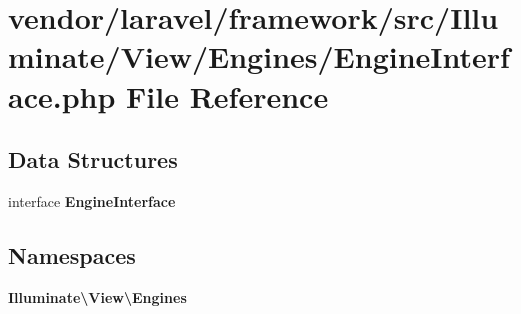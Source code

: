 \section{vendor/laravel/framework/src/\+Illuminate/\+View/\+Engines/\+Engine\+Interface.php File Reference}
\label{laravel_2framework_2src_2_illuminate_2_view_2_engines_2_engine_interface_8php}
\subsection*{Data Structures}
\begin{DoxyCompactItemize}
\item 
interface {\bf Engine\+Interface}
\end{DoxyCompactItemize}
\subsection*{Namespaces}
\begin{DoxyCompactItemize}
\item 
 {\bf Illuminate\textbackslash{}\+View\textbackslash{}\+Engines}
\end{DoxyCompactItemize}
